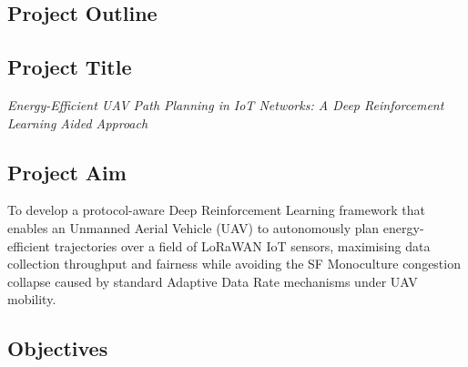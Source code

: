 \subsection{Project Outline}
\label{app:project_outline}

\subsection*{Project Title}

\textit{Energy-Efficient UAV Path Planning in IoT Networks: A Deep Reinforcement Learning Aided Approach}

\subsection*{Project Aim}

To develop a protocol-aware Deep Reinforcement Learning framework that enables an Unmanned Aerial Vehicle (UAV) to autonomously plan energy-efficient trajectories over a field of LoRaWAN IoT sensors, maximising data collection throughput and fairness while avoiding the SF Monoculture congestion collapse caused by standard Adaptive Data Rate mechanisms under UAV mobility.

\subsection*{Objectives}

